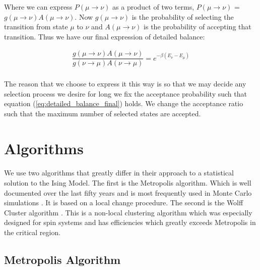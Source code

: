 \documentclass[12pt] {report} %
\begin{document}
			Where we can express $P(\mu \rightarrow \nu)$ as a product of two terms, $P(\mu \rightarrow \nu)$ = $g(\mu \rightarrow \nu)A(\mu \rightarrow \nu)$. Now $g(\mu \rightarrow \nu)$ is the probability of selecting the transition from state $\mu$ to $\nu$ and $A(\mu \rightarrow \nu)$ is the probability of accepting that transition. Thus we have our final expression of detailed balance:
			
			\begin{align}
				\dfrac{g(\mu \rightarrow \nu)A(\mu \rightarrow \nu)}{g(\nu \rightarrow \mu)A(\nu \rightarrow \mu)} =  e^{- \beta (E_\nu - E_\mu)}	\label{eq:detailed_balance_final}
			\end{align}
			
			\paragraph{}
				The reason that we choose to express it this way is so that we may decide any selection process we desire for long we fix the acceptance probability such that equation (\ref{eq:detailed_balance_final}) holds. We change the acceptance ratio such that the maximum number of selected states are accepted.
				
		
		\section{Algorithms}
			
			\paragraph{}
				We use two algorithms that greatly differ in their approach to a statistical solution to the Ising Model. The first is the Metropolis algorithm. Which is well documented over the last fifty years and is most frequently used in Monte Carlo simulations \cite{anagnostopoulos}. It is based on a local change procedure. The second is the Wolff Cluster algorithm \cite{wolff_cluster}. This is a non-local clustering algorithm which was especially designed for spin systems and has efficiencies which greatly exceeds Metropolis in the critical region. 
				
			\subsection{Metropolis Algorithm}
				
\end{document}
